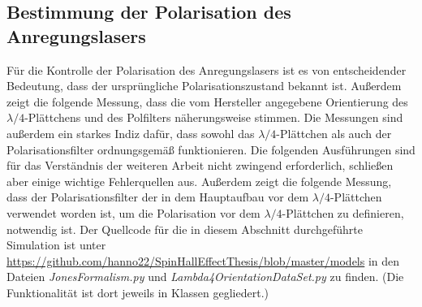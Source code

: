 \documentclass[titlepage,  ngerman]{article}
\begin{document}
	\subsection{Bestimmung der Polarisation des Anregungslasers}
	\label{sec:polarimeter}
	Für die Kontrolle der Polarisation des Anregungslasers ist es von entscheidender Bedeutung, dass der ursprüngliche Polarisationszustand bekannt ist. Außerdem zeigt die folgende Messung, dass die vom Hersteller angegebene Orientierung des $\lambda/4$-Plättchens und des Polfilters näherungsweise stimmen. Die Messungen sind außerdem ein starkes Indiz dafür, dass sowohl das $\lambda/4$-Plättchen als auch der Polarisationsfilter ordnungsgemäß funktionieren. Die folgenden Ausführungen sind für das Verständnis der weiteren Arbeit nicht zwingend erforderlich, schließen aber einige wichtige Fehlerquellen aus. Außerdem zeigt die folgende Messung, dass der Polarisationsfilter der in dem Hauptaufbau vor dem $\lambda / 4$-Plättchen verwendet worden ist, um die Polarisation vor dem $\lambda / 4$-Plättchen zu definieren, notwendig ist. Der Quellcode für die in diesem Abschnitt durchgeführte Simulation ist unter \url{https://github.com/hanno22/SpinHallEffectThesis/blob/master/models} in den Dateien \textit{JonesFormalism.py} und \textit{Lambda4OrientationDataSet.py} zu finden. (Die Funktionalität ist dort jeweils in Klassen gegliedert.)
\end{document}
